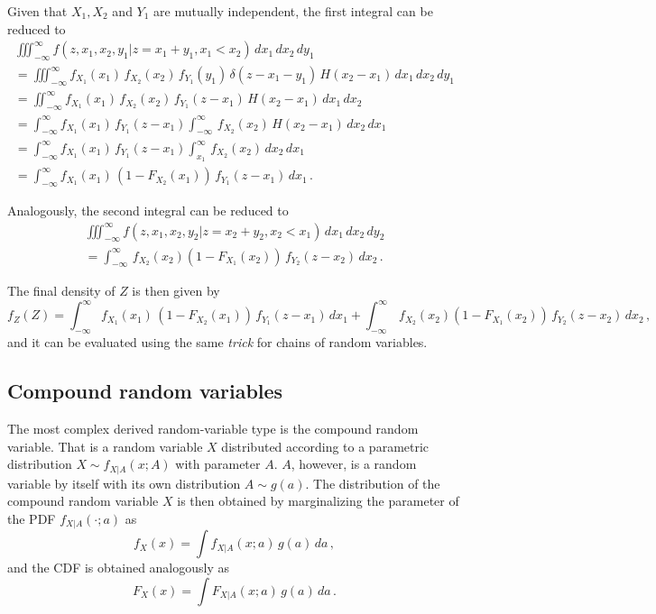 Given that $X_1, X_2$ and $Y_1$ are mutually independent, the first integral can be reduced to
\begin{multline}
\iiint_{-\infty}^\infty f(z,x_1,x_2,y_1|z=x_1+y_1,x_1<x_2)\,dx_1\,dx_2\,dy_1 \\
  = \iiint_{-\infty}^\infty f_{X_1}(x_1)\,f_{X_2}(x_2)\,f_{Y_1}(y_1)\,\delta(z-x_1-y_1)\,H(x_2-x_1)\,dx_1\,dx_2\,dy_1\\
  = \iint_{-\infty}^\infty f_{X_1}(x_1)\,f_{X_2}(x_2)\,f_{Y_1}(z-x_1)\,H(x_2-x_1)\,dx_1\,dx_2\\
  = \int_{-\infty}^\infty f_{X_1}(x_1)\,f_{Y_1}(z-x_1)\int_{-\infty}^\infty \,f_{X_2}(x_2)\,H(x_2-x_1)\,dx_2\,dx_1\\
  = \int_{-\infty}^\infty f_{X_1}(x_1)\,f_{Y_1}(z-x_1)\int_{x_1}^{\infty} \,f_{X_2}(x_2)\,dx_2\,dx_1\\
  = \int_{-\infty}^\infty f_{X_1}(x_1)\,\left(1-F_{X_2}(x_1)\right)\,f_{Y_1}(z-x_1)\,dx_1\,. \nonumber
\end{multline}

Analogously, the second integral can be reduced to
\begin{multline}
\iiint_{-\infty}^\infty f(z,x_1,x_2,y_2|z=x_2+y_2,x_2<x_1)\,dx_1\,dx_2\,dy_2 \\
 = \int_{-\infty}^\infty \,f_{X_2}(x_2)\left(1-F_{X_1}(x_2)\right)\,f_{Y_2}(z-x_2)\,dx_2\,. \nonumber
\end{multline}

The final density of $Z$ is then given by
\begin{equation}
 f_Z(Z) = \int_{-\infty}^\infty f_{X_1}(x_1)\,\left(1-F_{X_2}(x_1)\right)\,f_{Y_1}(z-x_1)\,dx_1
  + \int_{-\infty}^\infty \,f_{X_2}(x_2)\left(1-F_{X_1}(x_2)\right)\,f_{Y_2}(z-x_2)\,dx_2\,, \nonumber
\end{equation}
and it can be evaluated using the same \emph{trick} for chains of random variables.

\subsection{Compound random variables}
The most complex derived random-variable type is the compound random variable. That is a random variable
$X$ distributed according to a parametric distribution $X\sim f_{X|A}(x;A)$ with parameter $A$. $A$, however, 
is a random variable by itself with its own distribution $A\sim g(a)$. The distribution of the compound 
random variable $X$ is then obtained by marginalizing the parameter of the PDF $f_{X|A}(\cdot;a)$ as 
\begin{equation}
 f_X(x) = \int f_{X|A}(x;a)\,g(a)\,da\,,\nonumber
\end{equation}
and the CDF is obtained analogously as
\begin{equation}
 F_X(x) = \int F_{X|A}(x;a)\,g(a)\,da\,.\nonumber
\end{equation}

